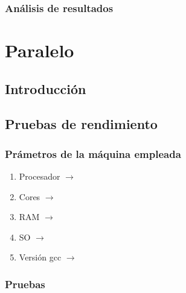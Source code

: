 \documentclass[12pt]{article}
\begin{document}
        \subsubsection{Análisis de resultados}
    \newpage
    \section{Paralelo}
        \subsection{Introducción}
        \noindent
        \subsection{Pruebas de rendimiento}
        \subsubsection{Prámetros de la máquina empleada}
            \begin{enumerate}
                \item Procesador $\rightarrow$ 
                \item Cores $\rightarrow$ 
                \item RAM $\rightarrow$ 
                \item SO $\rightarrow$ 
                \item Versión gcc $\rightarrow$ 
            \end{enumerate}
        \subsubsection{Pruebas}
        
        
\end{document}
